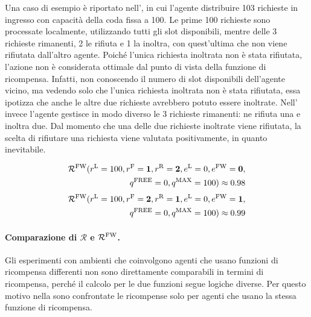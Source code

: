 Una caso di esempio è riportato nell', in cui l'agente distribuire 103 richieste in ingresso con capacità della coda fissa a 100. Le prime 100 richieste sono processate localmente, utilizzando tutti gli slot disponibili, mentre delle 3 richieste rimanenti, 2 le rifiuta e 1 la inoltra, con quest'ultima che non viene rifiutata dall'altro agente. Poiché l'unica richiesta inoltrata non è stata rifiutata, l'azione non è considerata ottimale dal punto di vista della funzione di ricompensa. Infatti, non conoscendo il numero di slot disponibili dell'agente vicino, ma vedendo solo che l'unica richiesta inoltrata non è stata rifiutata, essa ipotizza che anche le altre due richieste avrebbero potuto essere inoltrate. Nell' invece l'agente gestisce in modo diverso le 3 richieste rimanenti: ne rifiuta una e inoltra due. Dal momento che una delle due richieste inoltrate viene rifiutata, la scelta di rifiutare una richiesta viene valutata positivamente, in quanto inevitabile.

\begin{equation}\label{eq:5_reward_fw_non_optimal}
    \begin{split}
        \mathcal{R}^\textnormal{FW}(r^\textnormal{L} = 100, r^\textnormal{F} = \mathbf{1}, r^\textnormal{R} = \mathbf{2}, e^\textnormal{L} = 0, e^\textnormal{FW} = \mathbf{0}, \\ q^\textnormal{FREE} = 0, q^\textnormal{MAX} = 100) \approx 0.98
    \end{split}
\end{equation}
\begin{equation}\label{eq:5_reward_fw_optimal}
    \begin{split}
        \mathcal{R}^\textnormal{FW}(r^\textnormal{L} = 100, r^\textnormal{F} = \mathbf{2}, r^\textnormal{R} = \mathbf{1}, e^\textnormal{L} = 0, e^\textnormal{FW} = \mathbf{1}, \\ q^\textnormal{FREE} = 0, q^\textnormal{MAX} = 100) \approx 0.99 
    \end{split}
\end{equation}

\paragraph{Comparazione di $\mathcal{R}$ e $\mathcal{R}^\textnormal{FW}$.} Gli esperimenti con ambienti che coinvolgono agenti che usano funzioni di ricompensa differenti non sono direttamente comparabili in termini di ricompensa, perché il calcolo per le due funzioni segue logiche diverse. Per questo motivo nella  sono confrontate le ricompense solo per agenti che usano la stessa funzione di ricompensa.


